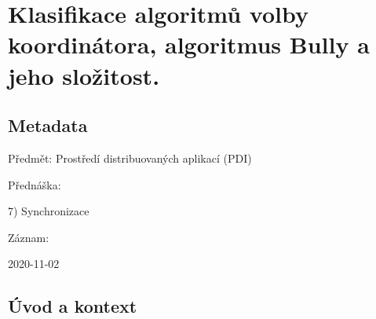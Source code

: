 

\chapter{Klasifikace algoritmů volby koordinátora, algoritmus Bully a jeho složitost.}


\section{Metadata}

\begin{compactitem}
    \item Předmět: Prostředí distribuovaných aplikací (PDI)
    \item Přednáška:
    \begin{compactitem}
        \item 7) Synchronizace
    \end{compactitem}
    \item Záznam:
    \begin{compactitem}
        \item 2020-11-02
    \end{compactitem}
\end{compactitem}


\section{Úvod a kontext}

